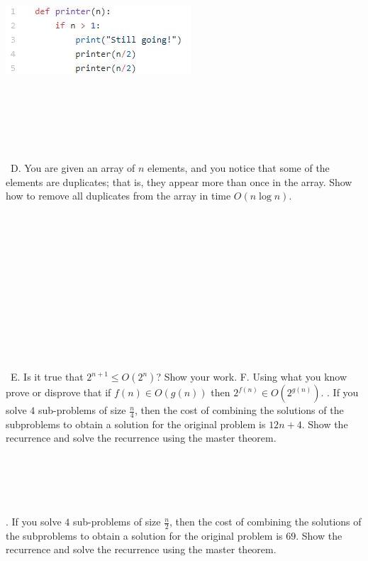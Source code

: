 \documentclass[12pt]{article}
\begin{document}
\includegraphics{printer.jpg}\\\\\\\\\\\\\\\
\noindent D. You are given an array of $n$ elements, and you notice that 
some of the elements are duplicates; that is, they appear more 
than once in the array. Show how to remove all duplicates from 
the array in time $O(n \log{n})$.\\\\\\\\\\\\\\\\\\\\\\\\\\\
\noindent E. Is it true that $2^{n+1} \leq O(2^n)$? Show your work.
\newpage 
\noindent F. Using what you know prove or disprove that if $f(n) \in O(g(n))$ then $2^{f(n)}\in O(2^{g(n)})$.
\newpage
\noindent 10. If you solve $4$ sub-problems of size $\frac{n}{4}$, then the cost of combining the solutions of the subproblems to obtain a solution for the original problem is $12n+4$. Show the recurrence and solve the recurrence using the master theorem.\\\\\\\\\\\\
. If you solve $4$ sub-problems of size $\frac{n}{2}$, then the cost of combining the solutions of the subproblems to obtain a solution for the original problem is $69$. Show the recurrence and solve the recurrence using the master theorem.\\\\\\\\\\\\
\end{document}
